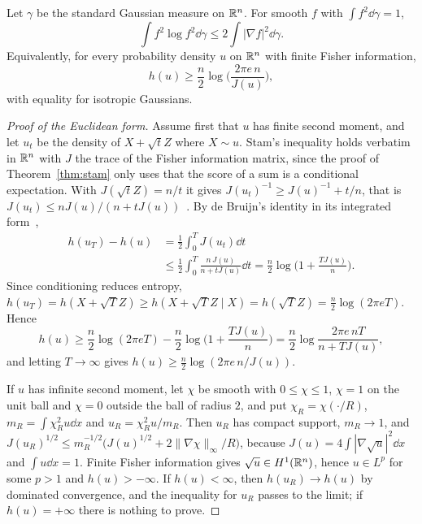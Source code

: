 \begin{theorem}[Gross]
\label{thm:lsi}
Let $\gamma$ be the standard Gaussian measure on $\mathbb{R}^n$. For smooth $f$ with $\int f^2\dd\gamma = 1$,
\[
\int f^2\log f^2\dd\gamma\leq2\int|\nabla f|^2\dd\gamma.
\]
Equivalently, for every probability density $u$ on $\mathbb{R}^n$ with finite Fisher information,
\[
h(u)\geq\frac n2\log\Big(\frac{2\pi e\,n}{J(u)}\Big),
\]
with equality for isotropic Gaussians.
\end{theorem}

\begin{proof}[Proof of the Euclidean form]
Assume first that $u$ has finite second moment, and let $u_t$ be the density of $X+\sqrt tZ$ where $X\sim u$. Stam's inequality holds verbatim in $\mathbb{R}^n$ with $J$ the trace of the Fisher information matrix, since the proof of Theorem~\ref{thm:stam} only uses that the score of a sum is a conditional expectation. With $J(\sqrt tZ) = n/t$ it gives $J(u_t)^{-1}\geq J(u)^{-1}+t/n$, that is $J(u_t)\leq nJ(u)/(n+tJ(u))$~\cite{carlen1991}. By de Bruijn's identity in its integrated form~\cite{barron1986},
\[
\begin{aligned}h(u_T) - h(u) &= \frac12\int_0^TJ(u_t)\dd t\\ &\leq\frac12\int_0^T\frac{n\,J(u)}{n+tJ(u)}\dd t = \frac n2\log\Big(1+\frac{TJ(u)}{n}\Big).\end{aligned}
\]
Since conditioning reduces entropy, $h(u_T) = h(X+\sqrt TZ)\geq h(X+\sqrt TZ\mid X) = h(\sqrt TZ) = \frac n2\log(2\pi eT)$. Hence
\[
h(u)\geq\frac n2\log(2\pi eT)-\frac n2\log\Big(1+\frac{TJ(u)}{n}\Big) = \frac n2\log\frac{2\pi e\,nT}{n+TJ(u)},
\]
and letting $T\to\infty$ gives $h(u)\geq\frac n2\log(2\pi e\,n/J(u))$.

If $u$ has infinite second moment, let $\chi$ be smooth with $0\leq\chi\leq1$, $\chi = 1$ on the unit ball and $\chi = 0$ outside the ball of radius $2$, and put $\chi_R = \chi(\cdot/R)$, $m_R = \int\chi_R^2u\dd x$ and $u_R = \chi_R^2u/m_R$. Then $u_R$ has compact support, $m_R\to1$, and $J(u_R)^{1/2}\leq m_R^{-1/2}\big(J(u)^{1/2}+2\|\nabla\chi\|_\infty/R\big)$, because $J(u) = 4\int|\nabla\sqrt u|^2\dd x$ and $\int u\dd x = 1$. Finite Fisher information gives $\sqrt u\in H^1(\mathbb{R}^n)$, hence $u\in L^p$ for some $p>1$ and $h(u)>-\infty$. If $h(u)<\infty$, then $h(u_R)\to h(u)$ by dominated convergence, and the inequality for $u_R$ passes to the limit; if $h(u) = +\infty$ there is nothing to prove.
\end{proof}

